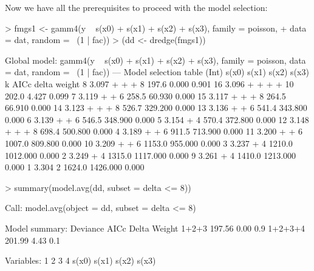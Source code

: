 \documentclass{article}
\begin{document}
Now we have all the prerequisites to proceed with the model selection:
\begin{Schunk}
\begin{Sinput}
> fmgs1 <- gamm4(y ~ s(x0) + s(x1) + s(x2) + s(x3), family = poisson, 
+     data = dat, random = ~(1 | fac))
> (dd <- dredge(fmgs1))
\end{Sinput}
\begin{Soutput}
Global model: gamm4(y ~ s(x0) + s(x1) + s(x2) + s(x3), family = poisson, data = dat, 
    random = ~(1 | fac))
---
Model selection table 
   (Int) s(x0) s(x1) s(x2) s(x3) k  AICc   delta    weight
8  3.097 +     +     +            8  197.6    0.000 0.901 
16 3.096 +     +     +     +     10  202.0    4.427 0.099 
7  3.119       +     +            6  258.5   60.930 0.000 
15 3.117       +     +     +      8  264.5   66.910 0.000 
14 3.123 +           +     +      8  526.7  329.200 0.000 
13 3.136             +     +      6  541.4  343.800 0.000 
6  3.139 +           +            6  546.5  348.900 0.000 
5  3.154             +            4  570.4  372.800 0.000 
12 3.148 +     +           +      8  698.4  500.800 0.000 
4  3.189 +     +                  6  911.5  713.900 0.000 
11 3.200       +           +      6 1007.0  809.800 0.000 
10 3.209 +                 +      6 1153.0  955.000 0.000 
3  3.237       +                  4 1210.0 1012.000 0.000 
2  3.249 +                        4 1315.0 1117.000 0.000 
9  3.261                   +      4 1410.0 1213.000 0.000 
1  3.304                          2 1624.0 1426.000 0.000 
\end{Soutput}
\begin{Sinput}
> summary(model.avg(dd, subset = delta <= 8))
\end{Sinput}
\begin{Soutput}
Call:  model.avg(object = dd, subset = delta <= 8)


Model summary:
        Deviance   AICc Delta Weight
1+2+3            197.56  0.00    0.9
1+2+3+4          201.99  4.43    0.1

Variables:
    1     2     3     4 
s(x0) s(x1) s(x2) s(x3) 


\end{Soutput}
\end{Schunk}
\end{document}

